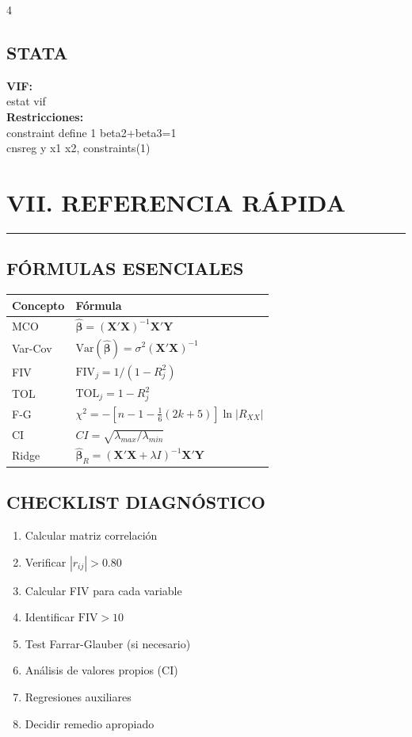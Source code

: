 \documentclass[6pt, landscape]{extarticle}
\newcommand{\sectionline}{%
  \nopagebreak\vspace{-4pt}\noindent\textcolor{GoldLeaf}{\rule{\linewidth}{1pt}}\par\vspace{2pt}%
}
\newcommand{\Var}{\text{Var}}
\newcommand{\FIV}{\text{FIV}}
\newcommand{\TOL}{\text{TOL}}
\newcommand{\Xmat}{\mathbf{X}}
\newcommand{\Ymat}{\mathbf{Y}}
\newcommand{\betahat}{\hat{\boldsymbol{\beta}}}
\begin{document}
\begin{multicols*}{4}
\subsection{STATA}

{\scriptsize\ttfamily
\textbf{VIF:}\\
estat vif\\[3pt]
\textbf{Restricciones:}\\
constraint define 1 beta2+beta3=1\\
cnsreg y x1 x2, constraints(1)
}

\section{VII. REFERENCIA RÁPIDA}
\sectionline

\subsection{FÓRMULAS ESENCIALES}

\begin{center}
{\tiny
\begin{tabular}{@{}ll@{}}
\toprule
\textbf{Concepto} & \textbf{Fórmula} \\
\midrule
MCO & $\betahat = (\Xmat'\Xmat)^{-1}\Xmat'\Ymat$ \\
Var-Cov & $\Var(\betahat) = \sigma^2(\Xmat'\Xmat)^{-1}$ \\
FIV & $\FIV_j = 1/(1-R_j^2)$ \\
TOL & $\TOL_j = 1-R_j^2$ \\
F-G & $\chi^2 = -[n-1-\frac{1}{6}(2k+5)]\ln|R_{XX}|$ \\
CI & $CI = \sqrt{\lambda_{max}/\lambda_{min}}$ \\
Ridge & $\betahat_R = (\Xmat'\Xmat + \lambda I)^{-1}\Xmat'\Ymat$ \\
\bottomrule
\end{tabular}
}
\end{center}

\subsection{CHECKLIST DIAGNÓSTICO}

\begin{enumerate}
    \item[$\square$] Calcular matriz correlación
    \item[$\square$] Verificar $|r_{ij}| > 0.80$
    \item[$\square$] Calcular FIV para cada variable
    \item[$\square$] Identificar $\FIV > 10$
    \item[$\square$] Test Farrar-Glauber (si necesario)
    \item[$\square$] Análisis de valores propios (CI)
    \item[$\square$] Regresiones auxiliares
    \item[$\square$] Decidir remedio apropiado
\end{enumerate}


\end{multicols*}
\end{document}
